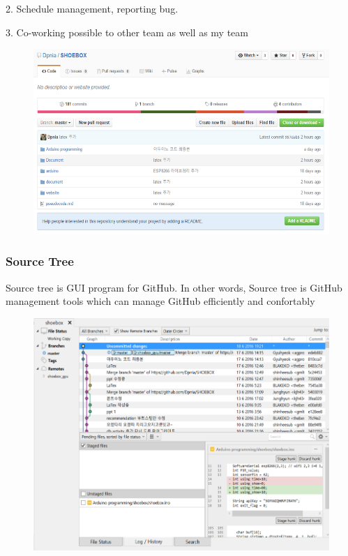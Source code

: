 \documentclass[conference]{IEEEtran}
\begin{document}
2. Schedule management, reporting bug.

3. Co-working possible to other team as well as my team
\begin{figure}[H]
\begin{center}
    \includegraphics[scale=0.5]{git}
    \label{fig:label}
\end{center}
\end{figure}

\subsubsection{Source Tree}
Source tree is GUI program for GitHub. In other words, Source tree is GitHub management tools which can manage GitHub efficiently and confortably
\begin{figure}[H]
\begin{center}
    \includegraphics[scale=0.5]{sourcetree}
    \label{fig:label}
\end{center}
\end{figure}
\end{document}
